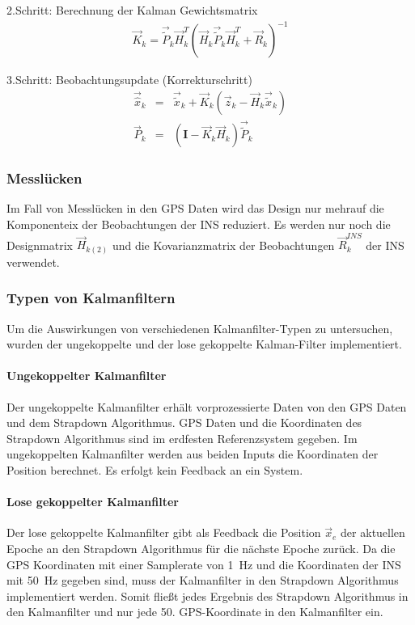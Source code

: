 2.Schritt: Berechnung der Kalman Gewichtsmatrix
\begin{eqnarray}
	\vec{K}_k = \vec{\tilde P}_k \vec{H}_k^T (\vec{H}_k \vec{\tilde P}_k \vec{H}_k^T + \vec{R}_k)^{-1}
\end{eqnarray}

3.Schritt: Beobachtungsupdate (Korrekturschritt)
\begin{eqnarray}
	\vec{\hat x}_k & = & \vec{\tilde x}_k + \vec{K}_k (\vec{z}_k - \vec{H}_k \vec{\tilde x}_k)\\
	\vec{P}_k & = & (\mathbf{I}-\vec{K}_k \vec{H}_k) \vec{\tilde P}_k
\end{eqnarray}

\subsubsection{Messlücken}

Im Fall von Messlücken in den GPS Daten wird das Design nur mehrauf die Komponenteix der Beobachtungen der INS reduziert. Es werden nur noch die Designmatrix $\vec{H}_{k(2)}$ und die Kovarianzmatrix der Beobachtungen $\vec{R}_k^{INS}$ der INS verwendet.

\subsubsection{Typen von Kalmanfiltern}
Um die Auswirkungen von verschiedenen Kalmanfilter-Typen zu untersuchen, wurden der ungekoppelte und der lose gekoppelte Kalman-Filter implementiert.

\paragraph{Ungekoppelter Kalmanfilter}

Der ungekoppelte Kalmanfilter erhält vorprozessierte Daten von den GPS Daten und dem Strapdown Algorithmus. GPS Daten und die Koordinaten des Strapdown Algorithmus sind im erdfesten Referenzsystem gegeben.
Im ungekoppelten Kalmanfilter werden aus beiden Inputs die Koordinaten der Position berechnet. Es erfolgt kein Feedback an ein System.

\paragraph{Lose gekoppelter Kalmanfilter}

Der lose gekoppelte Kalmanfilter gibt als Feedback die Position $\vec{x}_e$ der aktuellen Epoche an den Strapdown Algorithmus für die nächste Epoche zurück. Da die GPS Koordinaten mit einer Samplerate von 1~Hz und die Koordinaten der INS mit 50~Hz gegeben sind, muss der Kalmanfilter in den Strapdown Algorithmus implementiert werden. Somit fließt jedes Ergebnis des Strapdown Algorithmus in den Kalmanfilter und nur jede 50. GPS-Koordinate in den Kalmanfilter ein.